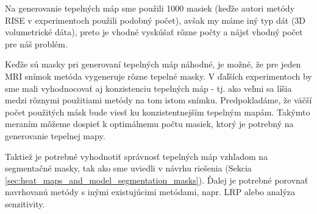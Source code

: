 Na generovanie tepelných máp sme použili 1000 masiek (keďže autori metódy RISE v experimentoch použili podobný počet), avšak my máme iný typ dát (3D volumetrické dáta), preto je vhodné vyskúšať rôzne počty a nájsť vhodný počet pre náš problém.

Keďže sú masky pri generovaní tepelných máp náhodné, je možné, že pre jeden MRI snímok metóda vygeneruje rôzne tepelné masky. V ďaľších experimentoch by sme mali vyhodnocovať aj konzistenciu tepelných máp - tj. ako veľmi sa líšia medzi rôznymi použitiami metódy na tom istom snímku. Predpokladáme, že väčší počet použitých másk bude viesť ku konzistentnejším tepelným mapám. Takýmto meraním môžeme dospieť k optimálnemu počtu masiek, ktorý je potrebný na generovanie tepelnej mapy.

Taktiež je potrebné vyhodnotiť správnosť tepelných máp vzhľadom na segmentačné masky, tak ako sme uviedli v návrhu riešenia (Sekcia \ref{sec:heat_maps_and_model_segmentation_masks}). Ďalej je potrebné porovnať navrhovanú metódy s inými existujúcimi metódami, napr. LRP alebo analýza senzitivity.


